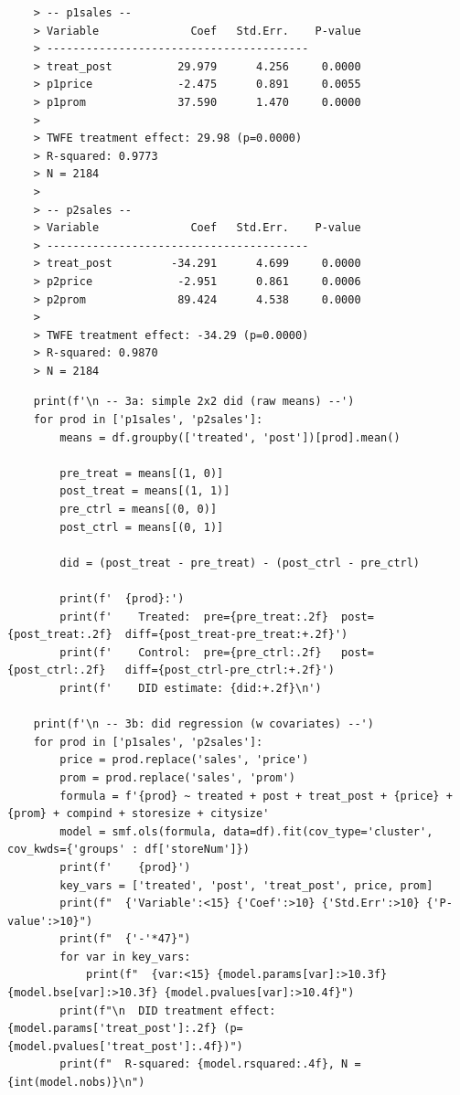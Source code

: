 \documentclass[10pt]{article}
\begin{document}
\begin{verbatim}
    > -- p1sales --
    > Variable              Coef   Std.Err.    P-value
    > ----------------------------------------
    > treat_post          29.979      4.256     0.0000
    > p1price             -2.475      0.891     0.0055
    > p1prom              37.590      1.470     0.0000
    > 
    > TWFE treatment effect: 29.98 (p=0.0000)
    > R-squared: 0.9773
    > N = 2184
    > 
    > -- p2sales --
    > Variable              Coef   Std.Err.    P-value
    > ----------------------------------------
    > treat_post         -34.291      4.699     0.0000
    > p2price             -2.951      0.861     0.0006
    > p2prom              89.424      4.538     0.0000
    > 
    > TWFE treatment effect: -34.29 (p=0.0000)
    > R-squared: 0.9870
    > N = 2184
\end{verbatim}
\begin{lstlisting}
    print(f'\n -- 3a: simple 2x2 did (raw means) --')
    for prod in ['p1sales', 'p2sales']: 
        means = df.groupby(['treated', 'post'])[prod].mean()

        pre_treat = means[(1, 0)]
        post_treat = means[(1, 1)]
        pre_ctrl = means[(0, 0)]
        post_ctrl = means[(0, 1)]

        did = (post_treat - pre_treat) - (post_ctrl - pre_ctrl)
        
        print(f'  {prod}:')
        print(f'    Treated:  pre={pre_treat:.2f}  post={post_treat:.2f}  diff={post_treat-pre_treat:+.2f}')
        print(f'    Control:  pre={pre_ctrl:.2f}   post={post_ctrl:.2f}   diff={post_ctrl-pre_ctrl:+.2f}')
        print(f'    DID estimate: {did:+.2f}\n')

    print(f'\n -- 3b: did regression (w covariates) --')
    for prod in ['p1sales', 'p2sales']:
        price = prod.replace('sales', 'price')
        prom = prod.replace('sales', 'prom')
        formula = f'{prod} ~ treated + post + treat_post + {price} + {prom} + compind + storesize + citysize'
        model = smf.ols(formula, data=df).fit(cov_type='cluster', cov_kwds={'groups' : df['storeNum']})
        print(f'    {prod}')
        key_vars = ['treated', 'post', 'treat_post', price, prom]
        print(f"  {'Variable':<15} {'Coef':>10} {'Std.Err':>10} {'P-value':>10}")
        print(f"  {'-'*47}")
        for var in key_vars:
            print(f"  {var:<15} {model.params[var]:>10.3f} {model.bse[var]:>10.3f} {model.pvalues[var]:>10.4f}")
        print(f"\n  DID treatment effect: {model.params['treat_post']:.2f} (p={model.pvalues['treat_post']:.4f})")
        print(f"  R-squared: {model.rsquared:.4f}, N = {int(model.nobs)}\n")
\end{lstlisting}
\end{document}
